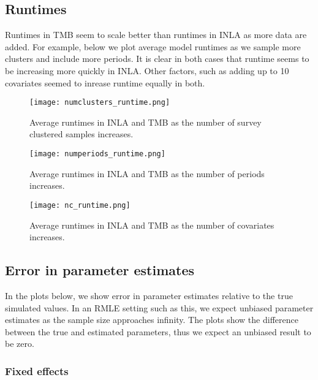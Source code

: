\documentclass[12pt]{article}
\begin{document}
\subsection{Runtimes}


Runtimes in TMB seem to scale better than runtimes in INLA as more data are added. For example, below we plot average model runtimes as we sample more clusters and include more periods. It is clear in both cases that runtime seems to be increasing more quickly in INLA. Other factors, such as adding up to 10 covariates seemed to inrease runtime equally in both. 


\begin{figure}[H]
\centering
\texttt{[image: numclusters\_runtime.png]}
\caption{Average runtimes in INLA and TMB as the number of survey clustered samples increases.}
\end{figure}


\begin{figure}[H]
\centering
\texttt{[image: numperiods\_runtime.png]}
\caption{Average runtimes in INLA and TMB as the number of periods increases.}
\end{figure}



\begin{figure}[H]
\centering
\texttt{[image: nc\_runtime.png]}
\caption{Average runtimes in INLA and TMB as the number of covariates increases.}
\end{figure}



\subsection{Error in parameter estimates}

In the plots below, we show error in parameter estimates relative to the true simulated values. In an RMLE setting such as this, we expect unbiased parameter estimates as the sample size approaches infinity. The plots show the difference between the true and estimated parameters, thus we expect an unbiased result to be zero. 



\subsubsection{Fixed effects}
\end{document}
